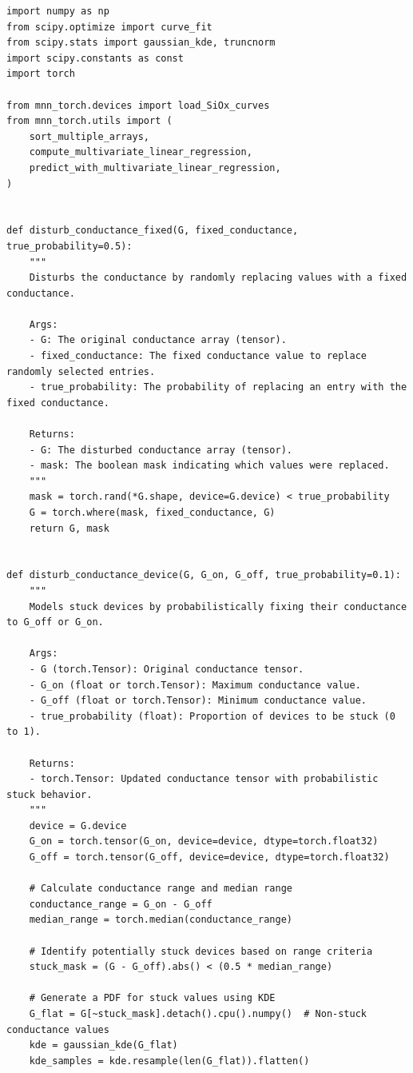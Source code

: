 \begin{lstlisting}[caption={mnn\_torch/effects.py},label={lst:mnn-src-effects}]
import numpy as np
from scipy.optimize import curve_fit
from scipy.stats import gaussian_kde, truncnorm
import scipy.constants as const
import torch

from mnn_torch.devices import load_SiOx_curves
from mnn_torch.utils import (
    sort_multiple_arrays,
    compute_multivariate_linear_regression,
    predict_with_multivariate_linear_regression,
)


def disturb_conductance_fixed(G, fixed_conductance, true_probability=0.5):
    """
    Disturbs the conductance by randomly replacing values with a fixed conductance.

    Args:
    - G: The original conductance array (tensor).
    - fixed_conductance: The fixed conductance value to replace randomly selected entries.
    - true_probability: The probability of replacing an entry with the fixed conductance.

    Returns:
    - G: The disturbed conductance array (tensor).
    - mask: The boolean mask indicating which values were replaced.
    """
    mask = torch.rand(*G.shape, device=G.device) < true_probability
    G = torch.where(mask, fixed_conductance, G)
    return G, mask


def disturb_conductance_device(G, G_on, G_off, true_probability=0.1):
    """
    Models stuck devices by probabilistically fixing their conductance to G_off or G_on.

    Args:
    - G (torch.Tensor): Original conductance tensor.
    - G_on (float or torch.Tensor): Maximum conductance value.
    - G_off (float or torch.Tensor): Minimum conductance value.
    - true_probability (float): Proportion of devices to be stuck (0 to 1).

    Returns:
    - torch.Tensor: Updated conductance tensor with probabilistic stuck behavior.
    """
    device = G.device
    G_on = torch.tensor(G_on, device=device, dtype=torch.float32)
    G_off = torch.tensor(G_off, device=device, dtype=torch.float32)

    # Calculate conductance range and median range
    conductance_range = G_on - G_off
    median_range = torch.median(conductance_range)

    # Identify potentially stuck devices based on range criteria
    stuck_mask = (G - G_off).abs() < (0.5 * median_range)

    # Generate a PDF for stuck values using KDE
    G_flat = G[~stuck_mask].detach().cpu().numpy()  # Non-stuck conductance values
    kde = gaussian_kde(G_flat)
    kde_samples = kde.resample(len(G_flat)).flatten()


\end{lstlisting}
